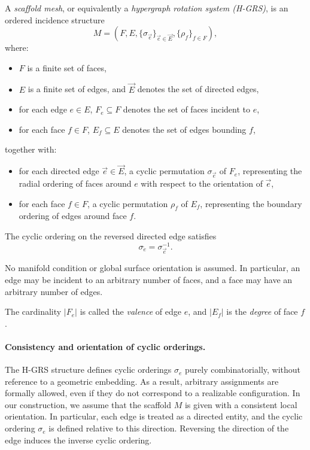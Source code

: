 \documentclass[acmtog,anonymous,review]{acmart}
\begin{document}
\begin{definition}
\label{def:HGRS}
A \emph{scaffold mesh}, or equivalently a \emph{hypergraph rotation
system (H-GRS)}, is an ordered incidence structure
\[
M = (F, E, \{\sigma_{\vec{e}}\}_{\vec{e} \in \vec{E}}, \{\rho_f\}_{f \in F}),
\]
where:
\begin{itemize}
    \item $F$ is a finite set of faces,
    \item $E$ is a finite set of edges, and $\vec{E}$ denotes the set of directed edges,
    \item for each edge $e \in E$, $F_e \subseteq F$ denotes the set of
    faces incident to $e$,
    \item for each face $f \in F$, $E_f \subseteq E$ denotes the set of
    edges bounding $f$,
\end{itemize}
together with:
\begin{itemize}
    \item for each directed edge $\vec{e} \in \vec{E}$, a cyclic permutation $\sigma_{\vec{e}}$ of $F_e$, representing the
    radial ordering of faces around $e$ with respect to the orientation of $\vec{e}$,
    \item for each face $f \in F$, a cyclic permutation $\rho_f$ of $E_f$, representing the
    boundary ordering of edges around face $f$.
\end{itemize}

The cyclic ordering on the reversed directed edge satisfies
\[
\sigma_{\overleftarrow{e}} = \sigma_{\vec{e}}^{-1}.
\]

No manifold condition or global surface orientation is assumed. In particular, an edge may be incident to an arbitrary number of faces,
and a face may have an arbitrary number of edges.

The cardinality $|F_e|$ is called the \emph{valence} of edge $e$, and $|E_f|$ is the \emph{degree} of face $f$.
\end{definition}



\paragraph{Consistency and orientation of cyclic orderings.}
The H-GRS structure defines cyclic orderings $\sigma_e$ purely
combinatorially, without reference to a geometric embedding.
As a result, arbitrary assignments are formally allowed, even if
they do not correspond to a realizable configuration.
In our construction, we assume that the scaffold $M$ is given
with a consistent local orientation. In particular, each edge is
treated as a directed entity, and the cyclic ordering $\sigma_e$
is defined relative to this direction. Reversing the direction
of the edge induces the inverse cyclic ordering.
\end{document}
